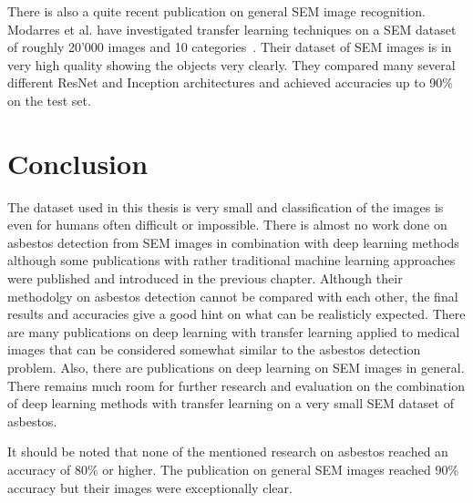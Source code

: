There is also a quite recent publication on general SEM image recognition. Modarres et al. have investigated transfer learning techniques on a SEM dataset of roughly 20'000 images and 10 categories~\cite{modarres2017neural}. Their dataset of SEM images is in very high quality showing the objects very clearly. They compared many several different ResNet and Inception architectures and achieved accuracies up to 90\% on the test set. \\




\section{Conclusion}

The dataset used in this thesis is very small and classification of the images is even for humans often difficult or impossible. There is almost no work done on asbestos detection from SEM images in combination with deep learning methods although some publications with rather traditional machine learning approaches were published and introduced in the previous chapter. Although their methodolgy on asbestos detection cannot be compared with each other, the final results  and accuracies give a good hint on what can be realisticly expected. There are many publications on deep learning with transfer learning applied to medical images that can be considered somewhat similar to the asbestos detection problem. Also, there are publications on deep learning on SEM images in general. There remains much room for further research and evaluation on the combination of deep learning methods with transfer learning on a very small SEM dataset of asbestos.

It should be noted that none of the mentioned research on asbestos reached an accuracy of 80\% or higher. The publication on general SEM images reached 90\% accuracy but their images were exceptionally clear.\\

















